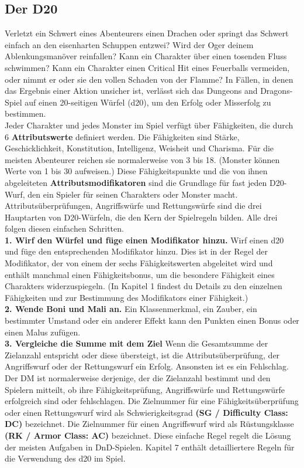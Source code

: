 \subsection{Der D20}
Verletzt ein Schwert eines Abenteurers einen Drachen oder springt das Schwert einfach an den eisenharten Schuppen entzwei? Wird der Oger deinem Ablenkungsmanöver reinfallen? Kann ein Charakter über einen tosenden Fluss schwimmen? Kann ein Charakter einen Critical Hit eines Feuerballs vermeiden, oder nimmt er oder sie den vollen Schaden von der Flamme? In Fällen, in denen das Ergebnis einer Aktion unsicher ist, verlässt sich das Dungeons and Dragons-Spiel auf einen 20-seitigen Würfel (d20), um den Erfolg oder Misserfolg zu bestimmen.\\
Jeder Charakter und jedes Monster im Spiel verfügt über Fähigkeiten, die durch 6 \textbf{Attributswerte} definiert werden. Die Fähigkeiten sind Stärke, Geschicklichkeit, Konstitution, Intelligenz, Weisheit und Charisma. Für die meisten Abenteurer reichen sie normalerweise von 3 bis 18. (Monster können Werte von 1 bis 30 aufweisen.) Diese Fähigkeitspunkte und die von ihnen abgeleiteten \textbf{Attributsmodifikatoren} sind die Grundlage für fast jeden D20-Wurf, den ein Spieler für seinen Charakters oder Monster macht. Attributsüberprüfungen, Angriffswürfe und Rettungswürfe sind die drei Hauptarten von D20-Würfeln, die den Kern der Spielregeln bilden. Alle drei folgen diesen einfachen Schritten.\\
\textbf{1. Wirf den Würfel und füge einen Modifikator hinzu.}
Wirf einen d20 und füge den entsprechenden Modifikator hinzu. Dies ist in der Regel der Modifikator, der von einem der sechs Fähigkeitswerten abgeleitet wird und enthält manchmal einen Fähigkeitsbonus, um die besondere Fähigkeit eines Charakters widerzuspiegeln. (In Kapitel 1 findest du Details zu den einzelnen Fähigkeiten und zur Bestimmung des Modifikators einer Fähigkeit.)\\
\textbf{2. Wende Boni und Mali an.} Ein Klassenmerkmal, ein Zauber, ein bestimmter Umstand oder ein anderer Effekt kann den Punkten einen Bonus oder einen Malus zufügen.\\
\textbf{3. Vergleiche die Summe mit dem Ziel} Wenn die Gesamtsumme der Zielanzahl entspricht oder diese übersteigt, ist die Attributsüberprüfung, der Angriffswurf oder der Rettungswurf ein Erfolg. Ansonsten ist es ein Fehlschlag. Der DM ist normalerweise derjenige, der die Zielanzahl bestimmt und den Spielern mitteilt, ob ihre Fähigkeitsprüfung, Angriffswürfe und Rettungswürfe erfolgreich sind oder fehlschlagen. Die Zielnummer für eine Fähigkeitsüberprüfung oder einen Rettungswurf wird als Schwierigkeitsgrad \textbf{(SG / Difficulty Class: DC)} bezeichnet. Die Zielnummer für einen Angriffswurf wird als Rüstungsklasse \textbf{(RK / Armor Class: AC)} bezeichnet. Diese einfache Regel regelt die Lösung der meisten Aufgaben in DnD-Spielen. Kapitel 7 enthält detailliertere Regeln für die Verwendung des d20 im Spiel.

